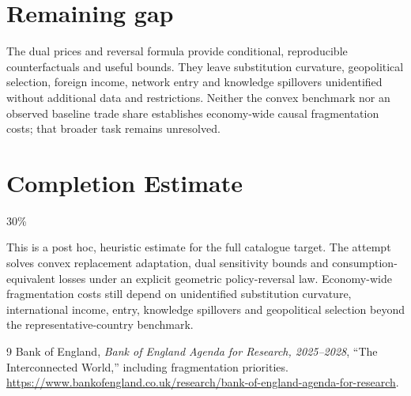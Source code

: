 \documentclass[11pt]{article}
\theoremstyle{definition}
\begin{document}
\section*{Remaining gap}
The dual prices and reversal formula provide conditional, reproducible
counterfactuals and useful bounds. They leave substitution curvature,
geopolitical selection, foreign income, network entry and knowledge spillovers
unidentified without additional data and restrictions. Neither the convex
benchmark nor an observed baseline trade share establishes economy-wide
causal fragmentation costs; that broader task remains unresolved.

\section{Completion Estimate}
30\%

This is a post hoc, heuristic estimate for the full catalogue target.
The attempt solves convex replacement adaptation, dual sensitivity bounds and consumption-equivalent losses under an explicit geometric policy-reversal law. Economy-wide fragmentation costs still depend on unidentified substitution curvature, international income, entry, knowledge spillovers and geopolitical selection beyond the representative-country benchmark.

\begin{thebibliography}{9}
 Bank of England, \emph{Bank of England Agenda for Research,
2025--2028}, ``The Interconnected World,'' including fragmentation priorities.
\url{https://www.bankofengland.co.uk/research/bank-of-england-agenda-for-research}.
\end{thebibliography}
\end{document}
